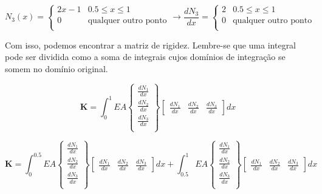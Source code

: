         \begin{equation*}
            N_3(x) = 
            \left\{
            \begin{array}{cl}
                2x-1 & 0.5 \leq x \leq 1\\
                0 & \text{qualquer outro ponto}\\
            \end{array}
            \right.
            \rightarrow
            \frac{dN_3}{dx} = 
            \left\{
            \begin{array}{cl}
                2 & 0.5 \leq x \leq 1\\
                0 & \text{qualquer outro ponto}\\
            \end{array}
            \right.
        \end{equation*}

        Com isso, podemos encontrar a matriz de rigidez. Lembre-se que uma integral pode ser dividida como a soma de integrais cujos domínios de integração se somem no domínio original.

        \begin{equation*}
            \mathbf{K} = \int_0^1 EA 
            \begin{Bmatrix}
            \frac{dN_1}{dx}\\
            \frac{dN_2}{dx}\\
            \frac{dN_3}{dx}\\
            \end{Bmatrix}
            \begin{bmatrix}
            \frac{dN_1}{dx} &
            \frac{dN_2}{dx} &
            \frac{dN_3}{dx}
            \end{bmatrix} dx
        \end{equation*}

        \begin{equation*}
            \mathbf{K} = \int_0^{0.5} EA 
            \begin{Bmatrix}
            \frac{dN_1}{dx}\\
            \frac{dN_2}{dx}\\
            \frac{dN_3}{dx}\\
            \end{Bmatrix}
            \begin{bmatrix}
            \frac{dN_1}{dx} &
            \frac{dN_2}{dx} &
            \frac{dN_3}{dx}
            \end{bmatrix} dx + \int_{0.5}^{1} EA 
            \begin{Bmatrix}
            \frac{dN_1}{dx}\\
            \frac{dN_2}{dx}\\
            \frac{dN_3}{dx}\\
            \end{Bmatrix}
            \begin{bmatrix}
            \frac{dN_1}{dx} &
            \frac{dN_2}{dx} &
            \frac{dN_3}{dx}
            \end{bmatrix} dx
        \end{equation*}

